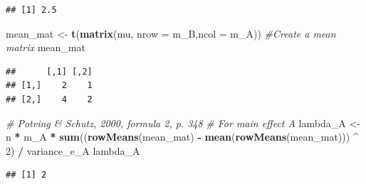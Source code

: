 \documentclass[]{book}
\newenvironment{Shaded}{\begin{snugshade}}{\end{snugshade}}
\newcommand{\CommentTok}[1]{\textcolor[rgb]{0.56,0.35,0.01}{\textit{#1}}}
\newcommand{\DataTypeTok}[1]{\textcolor[rgb]{0.13,0.29,0.53}{#1}}
\newcommand{\DecValTok}[1]{\textcolor[rgb]{0.00,0.00,0.81}{#1}}
\newcommand{\KeywordTok}[1]{\textcolor[rgb]{0.13,0.29,0.53}{\textbf{#1}}}
\newcommand{\NormalTok}[1]{#1}
\newcommand{\OperatorTok}[1]{\textcolor[rgb]{0.81,0.36,0.00}{\textbf{#1}}}
\newcommand{\StringTok}[1]{\textcolor[rgb]{0.31,0.60,0.02}{#1}}
\begin{document}
\begin{verbatim}
## [1] 2.5
\end{verbatim}

\begin{Shaded}
\begin{Highlighting}[]
\NormalTok{mean_mat <-}\StringTok{ }\KeywordTok{t}\NormalTok{(}\KeywordTok{matrix}\NormalTok{(mu, }\DataTypeTok{nrow =}\NormalTok{ m_B,}\DataTypeTok{ncol =}\NormalTok{ m_A)) }\CommentTok{#Create a mean matrix}
\NormalTok{mean_mat}
\end{Highlighting}
\end{Shaded}

\begin{verbatim}
##      [,1] [,2]
## [1,]    2    1
## [2,]    4    2
\end{verbatim}

\begin{Shaded}
\begin{Highlighting}[]
\CommentTok{# Potving & Schutz, 2000, formula 2, p. 348}
\CommentTok{# For main effect A}
\NormalTok{lambda_A <-}\StringTok{ }\NormalTok{n }\OperatorTok{*}\StringTok{ }\NormalTok{m_A }\OperatorTok{*}\StringTok{ }\KeywordTok{sum}\NormalTok{((}\KeywordTok{rowMeans}\NormalTok{(mean_mat) }\OperatorTok{-}\StringTok{ }\KeywordTok{mean}\NormalTok{(}\KeywordTok{rowMeans}\NormalTok{(mean_mat))) }\OperatorTok{^}\StringTok{ }\DecValTok{2}\NormalTok{) }\OperatorTok{/}\StringTok{ }\NormalTok{variance_e_A }
\NormalTok{lambda_A}
\end{Highlighting}
\end{Shaded}

\begin{verbatim}
## [1] 2
\end{verbatim}
\end{document}

